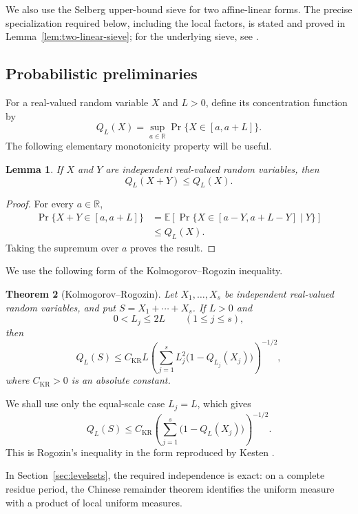 \documentclass[11pt,reqno]{amsart}
\numberwithin{equation}{section}
\theoremstyle{plain}
\newtheorem{theorem}{Theorem}[section]
\newtheorem{lemma}[theorem]{Lemma}
\theoremstyle{definition}
\theoremstyle{remark}
\begin{document}
We also use the Selberg upper-bound sieve for two affine-linear forms. The precise specialization required below, including the local factors, is stated and proved in Lemma~\ref{lem:two-linear-sieve}; for the underlying sieve, see
\cite[Chapter~2]{HalberstamRichert1974}.

\subsection{Probabilistic preliminaries}

For a real-valued random variable $X$ and $L>0$, define its concentration function by
\[
Q_L(X)
=
\sup_{a\in\mathbb R}
\Pr\{X\in[a,a+L]\}.
\]
The following elementary monotonicity property will be useful.

\begin{lemma}\label{lem:convolution}
If $X$ and $Y$ are independent real-valued random variables, then
\[
Q_L(X+Y)\le Q_L(X).
\]
\end{lemma}

\begin{proof}
For every $a\in\mathbb R$,
\[
\begin{aligned}
\Pr\{X+Y\in[a,a+L]\}
&=
\mathbb E\!\left[
\Pr\{X\in[a-Y,a+L-Y]\mid Y\}
\right]\\
&\le Q_L(X).
\end{aligned}
\]
Taking the supremum over $a$ proves the result.
\end{proof}

We use the following form of the Kolmogorov--Rogozin inequality.

\begin{theorem}[Kolmogorov--Rogozin]\label{thm:KR}
Let $X_1,\ldots,X_s$ be independent real-valued random variables, and put $S=X_1+\cdots+X_s$. If $L>0$ and
\[
0<L_j\le2L
\qquad (1\le j\le s),
\]
then
\[
Q_L(S)
\le
C_{\mathrm{KR}}L
\left(
\sum_{j=1}^s
L_j^2\bigl(1-Q_{L_j}(X_j)\bigr)
\right)^{-1/2},
\]
where $C_{\mathrm{KR}}>0$ is an absolute constant.
\end{theorem}

We shall use only the equal-scale case $L_j=L$, which gives
\[
Q_L(S)
\le
C_{\mathrm{KR}}
\left(
\sum_{j=1}^s
\bigl(1-Q_L(X_j)\bigr)
\right)^{-1/2}.
\]
This is Rogozin's inequality in the form reproduced by Kesten
\cite[Theorem~1, equation~(1.2)]{Kesten1969}.

In Section~\ref{sec:levelsets}, the required independence is exact: on a complete residue period, the Chinese remainder theorem identifies the uniform measure with a product of local uniform measures.
\end{document}
